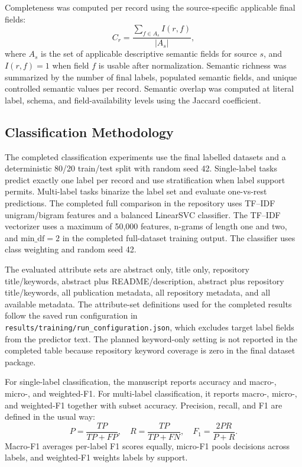 \documentclass[pdflatex,sn-mathphys-num]{sn-jnl}%
\theoremstyle{thmstyleone}%
\theoremstyle{thmstyletwo}%
\theoremstyle{thmstylethree}%
\begin{document}
Completeness was computed per record using the source-specific applicable final fields:
\[
C_r=\frac{\sum_{f \in A_s} I(r,f)}{|A_s|},
\]
where \(A_s\) is the set of applicable descriptive semantic fields for source \(s\), and \(I(r,f)=1\) when field \(f\) is usable after normalization. Semantic richness was summarized by the number of final labels, populated semantic fields, and unique controlled semantic values per record. Semantic overlap was computed at literal label, schema, and field-availability levels using the Jaccard coefficient.

\subsection{Classification Methodology}
\label{subsec:classification-methodology}

The completed classification experiments use the final labelled datasets and a deterministic 80/20 train/test split with random seed 42. Single-label tasks predict exactly one label per record and use stratification when label support permits. Multi-label tasks binarize the label set and evaluate one-vs-rest predictions. The completed full comparison in the repository uses TF--IDF unigram/bigram features and a balanced LinearSVC classifier. The TF--IDF vectorizer uses a maximum of 50,000 features, n-grams of length one and two, and \(\mathrm{min\_df}=2\) in the completed full-dataset training output. The classifier uses class weighting and random seed 42.

The evaluated attribute sets are abstract only, title only, repository title/keywords, abstract plus README/description, abstract plus repository title/keywords, all publication metadata, all repository metadata, and all available metadata. The attribute-set definitions used for the completed results follow the saved run configuration in \texttt{results/training/run\_configuration.json}, which excludes target label fields from the predictor text. The planned keyword-only setting is not reported in the completed table because repository keyword coverage is zero in the final dataset package.

For single-label classification, the manuscript reports accuracy and macro-, micro-, and weighted-F1. For multi-label classification, it reports macro-, micro-, and weighted-F1 together with subset accuracy. Precision, recall, and F1 are defined in the usual way:
\[
P=\frac{TP}{TP+FP}, \quad R=\frac{TP}{TP+FN}, \quad F_1=\frac{2PR}{P+R}.
\]
Macro-F1 averages per-label F1 scores equally, micro-F1 pools decisions across labels, and weighted-F1 weights labels by support.
\end{document}
